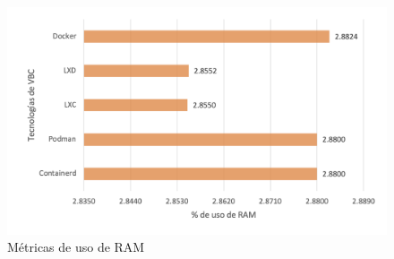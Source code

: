 \begin{figure}[H]
    \centering
    \includegraphics[scale=0.5] {tablas-images/cp4/ram.png}
    \caption{Métricas de uso de RAM}\label{fig:tabla-metricas-ram}
\end{figure}